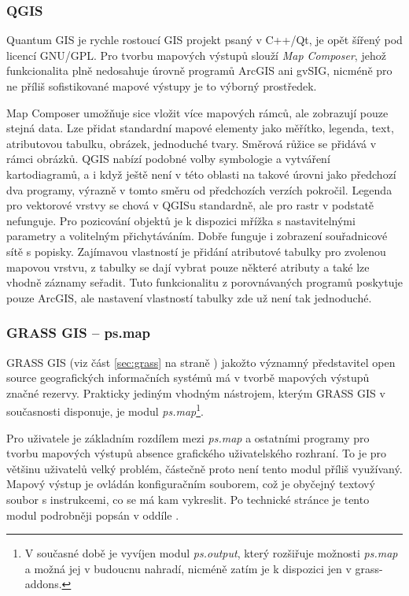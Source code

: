 \documentclass[a4paper,12pt,draft]{article}
\newcommand{\modul}[1]{\emph{#1}}
\begin{document}
\subsubsection{QGIS}
Quantum GIS je rychle rostoucí GIS projekt psaný v C++/Qt, je opět
šířený
pod licencí GNU/GPL. Pro tvorbu mapových výstupů slouží \emph{Map
Composer}, jehož funkcionalita plně nedosahuje úrovně programů ArcGIS
ani gvSIG, nicméně pro ne příliš sofistikované mapové výstupy je to
výborný prostředek.

Map Composer umožňuje sice vložit více mapových rámců, ale
zobrazují pouze stejná data. Lze přidat standardní mapové elementy
jako měřítko, legenda, text, atributovou tabulku, obrázek, jednoduché
tvary. Směrová růžice se přidává v rámci obrázků.
QGIS nabízí podobné volby symbologie a vytváření kartodiagramů,
a i když
ještě není v této oblasti na takové úrovni jako předchozí dva
programy, výrazně
v tomto směru od předchozích verzích pokročil.
Legenda pro vektorové vrstvy se chová v QGISu standardně, ale
pro rastr v podstatě nefunguje. Pro pozicování objektů je k dispozici
mřížka s nastavitelnými parametry a volitelným přichytáváním. Dobře
funguje i zobrazení souřadnicové sítě s popisky. Zajímavou
vlastností je přidání atributové tabulky pro zvolenou mapovou
vrstvu, z tabulky se dají vybrat pouze některé atributy a také lze
vhodně záznamy seřadit. Tuto funkcionalitu z porovnávaných programů
poskytuje pouze ArcGIS, ale nastavení vlastností tabulky zde už není
tak jednoduché.



\subsubsection{GRASS GIS -- ps.map}
\label{sec:porovnani:psmap}
GRASS GIS (viz část \ref{sec:grass} na straně \pageref{sec:grass})
jakožto významný představitel open source geografických informačních
systémů má v tvorbě mapových výstupů značné rezervy. Prakticky
jediným vhodným nástrojem, kterým GRASS GIS v současnosti disponuje,
je modul \modul{ps.map}\footnote{V současné době je vyvíjen modul
\modul{ps.output}, který rozšiřuje možnosti \modul{ps.map} a možná
jej v budoucnu nahradí, nicméně zatím je k dispozici jen v grass-addons.}.

Pro uživatele je základním rozdílem mezi \modul{ps.map} a ostatními
programy pro tvorbu mapových výstupů  absence grafického uživatelského
rozhraní. To je pro většinu uživatelů velký problém, částečně
proto není tento modul příliš využívaný. Mapový výstup je ovládán
konfiguračním souborem, což je obyčejný textový soubor s instrukcemi,
co se má kam vykreslit. Po technické stránce je tento modul podrobněji
popsán v oddíle .
\end{document}
